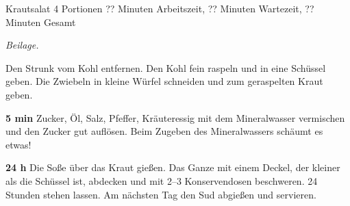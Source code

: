 \begin{recipe}{Krautsalat} {4 Portionen} {?? Minuten Arbeitszeit, ?? Minuten Wartezeit, ?? Minuten Gesamt}

  \freeform{}\textit{Beilage.}


  Den Strunk vom Kohl entfernen.
  Den Kohl fein raspeln und in eine Schüssel geben.
  Die Zwiebeln in kleine Würfel schneiden und zum geraspelten Kraut geben.

  \newstep{}\textbf{5 min}
  Zucker, Öl, Salz, Pfeffer, Kräuteressig mit dem Mineralwasser vermischen und den Zucker gut auflösen.
  Beim Zugeben des Mineralwassers schäumt es etwas!

  \newstep{}\textbf{24 h}
  Die Soße über das Kraut gießen.
  Das Ganze mit einem Deckel, der kleiner als die Schüssel ist, abdecken und mit 2–3 Konservendosen beschweren.
  24 Stunden stehen lassen.
  Am nächsten Tag den Sud abgießen und servieren.

  \freeform{}\hrulefill{}

\end{recipe}
